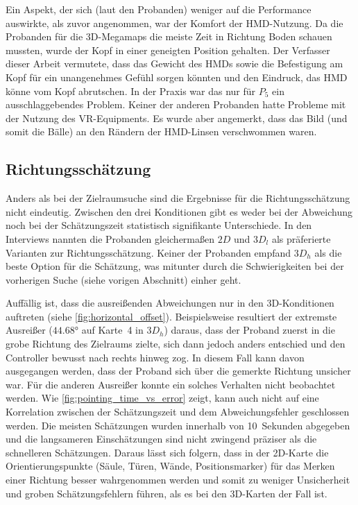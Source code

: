 Ein Aspekt, der sich (laut den Probanden) weniger auf die Performance auswirkte, als zuvor angenommen, war der Komfort der HMD-Nutzung.
Da die Probanden für die 3D-Megamaps die meiste Zeit in Richtung Boden schauen mussten, wurde der Kopf in einer geneigten Position gehalten.
Der Verfasser dieser Arbeit vermutete, dass das Gewicht des HMDs sowie die Befestigung am Kopf für ein unangenehmes Gefühl sorgen könnten und den Eindruck, das HMD könne vom Kopf abrutschen.
In der Praxis war das nur für $P_5$ ein ausschlaggebendes Problem.
Keiner der anderen Probanden hatte Probleme mit der Nutzung des VR-Equipments.
Es wurde aber angemerkt, dass das Bild (und somit die Bälle) an den Rändern der HMD-Linsen verschwommen waren.

\subsection{Richtungsschätzung}
Anders als bei der Zielraumsuche sind die Ergebnisse für die Richtungsschätzung nicht eindeutig.
Zwischen den drei Konditionen gibt es weder bei der Abweichung noch bei der Schätzungszeit statistisch signifikante Unterschiede.
In den Interviews nannten die Probanden gleichermaßen $2D$ und $3D_l$ als präferierte Varianten zur Richtungsschätzung. 
Keiner der Probanden empfand $3D_h$ als die beste Option für die Schätzung, was mitunter durch die Schwierigkeiten bei der vorherigen Suche (siehe vorigen Abschnitt) einher geht. 

Auffällig ist, dass die ausreißenden Abweichungen nur in den 3D-Konditionen auftreten (siehe \autoref{fig:horizontal_offset}).
Beispielsweise resultiert der extremste Ausreißer ($\ang{44,68}$ auf Karte~4 in $3D_h$) daraus, dass der Proband zuerst in die grobe Richtung des Zielraums zielte, sich dann jedoch anders entschied und den Controller bewusst nach rechts hinweg zog.
In diesem Fall kann davon ausgegangen werden, dass der Proband sich über die gemerkte Richtung unsicher war.
Für die anderen Ausreißer konnte ein solches Verhalten nicht beobachtet werden.
Wie \autoref{fig:pointing_time_vs_error} zeigt, kann auch nicht auf eine Korrelation zwischen der Schätzungszeit und dem Abweichungsfehler geschlossen werden.
Die meisten Schätzungen wurden innerhalb von 10~Sekunden abgegeben und die langsameren Einschätzungen sind nicht zwingend präziser als die schnelleren Schätzungen.
Daraus lässt sich folgern, dass in der 2D-Karte die Orientierungspunkte (Säule, Türen, Wände, Positionsmarker) für das Merken einer Richtung besser wahrgenommen werden und somit zu weniger Unsicherheit und groben Schätzungsfehlern führen, als es bei den 3D-Karten der Fall ist.


